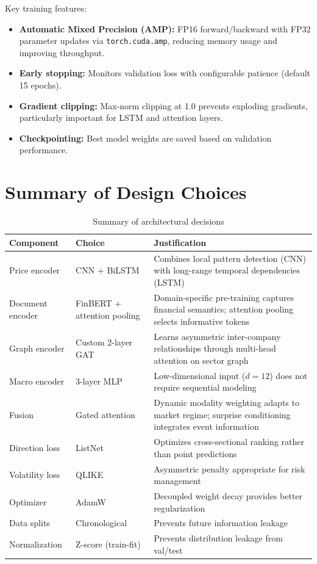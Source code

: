 \documentclass[12pt, a4paper]{article}
\begin{document}
Key training features:
\begin{itemize}[nosep]
    \item \textbf{Automatic Mixed Precision (AMP):} FP16 forward/backward with FP32 parameter updates via \texttt{torch.cuda.amp}, reducing memory usage and improving throughput.
    \item \textbf{Early stopping:} Monitors validation loss with configurable patience (default 15 epochs).
    \item \textbf{Gradient clipping:} Max-norm clipping at 1.0 prevents exploding gradients, particularly important for LSTM and attention layers.
    \item \textbf{Checkpointing:} Best model weights are saved based on validation performance.
\end{itemize}


\section{Summary of Design Choices}

\begin{table}[H]
\centering
\caption{Summary of architectural decisions}
\small
\begin{tabular}{p{3cm}p{4cm}p{6cm}}
\toprule
\textbf{Component} & \textbf{Choice} & \textbf{Justification} \\
\midrule
Price encoder & CNN + BiLSTM & Combines local pattern detection (CNN) with long-range temporal dependencies (LSTM) \\
\midrule
Document encoder & FinBERT + attention pooling & Domain-specific pre-training captures financial semantics; attention pooling selects informative tokens \\
\midrule
Graph encoder & Custom 2-layer GAT & Learns asymmetric inter-company relationships through multi-head attention on sector graph \\
\midrule
Macro encoder & 3-layer MLP & Low-dimensional input ($d{=}12$) does not require sequential modeling \\
\midrule
Fusion & Gated attention & Dynamic modality weighting adapts to market regime; surprise conditioning integrates event information \\
\midrule
Direction loss & ListNet & Optimizes cross-sectional ranking rather than point predictions \\
\midrule
Volatility loss & QLIKE & Asymmetric penalty appropriate for risk management \\
\midrule
Optimizer & AdamW & Decoupled weight decay provides better regularization \\
\midrule
Data splits & Chronological & Prevents future information leakage \\
\midrule
Normalization & Z-score (train-fit) & Prevents distribution leakage from val/test \\
\bottomrule
\end{tabular}
\end{table}
\end{document}
